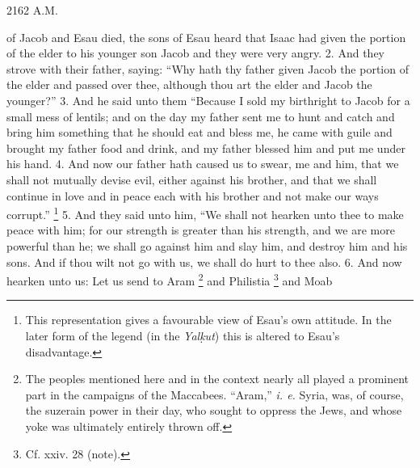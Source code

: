 2162 A.M.

of Jacob and Esau died, the sons of Esau heard that Isaac had given the portion of the elder to his younger son Jacob and they were very angry. 2. And they strove with their father, saying: ``Why hath thy father given Jacob the portion of the elder and passed over thee, although thou art the elder and Jacob the younger?'' 3. And he said unto them ``Because I sold my birthright to Jacob for a small mess of lentils; and on the day my father sent me to hunt and catch and bring him something that he should eat and bless me, he came with guile and brought my father food and drink, and my father blessed him and put me under his hand. 4. And now our father hath caused us to swear, me and him, that we shall not mutually devise evil, either against his brother, and that we shall continue in love and in peace each with his brother and not make our ways corrupt.'' \footnote{This representation gives a favourable view of Esau's own attitude. In the later form of the legend (in the \emph{Yal\d{k}ut}) this is altered to Esau's disadvantage.} 5. And they said unto him, ``We shall not hearken unto thee to make peace with him; for our strength is greater than his strength, and we are more powerful than he; we shall go against him and slay him, and destroy him and his sons. And if thou wilt not go with us, we shall do hurt to thee also. 6. And now hearken unto us: Let us send to Aram \footnote{The peoples mentioned here and in the context nearly all played a prominent part in the campaigns of the Maccabees. ``Aram,'' \emph{i. e.} Syria, was, of course, the suzerain power in their day, who sought to oppress the Jews, and whose yoke was ultimately entirely thrown off.} and Philistia \footnote{Cf. xxiv. 28 (note).} and Moab

